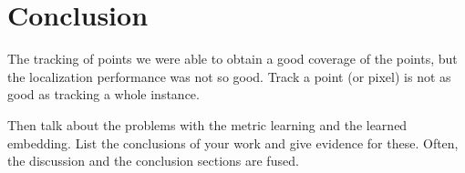 
%

\chapter{Conclusion}

The tracking of points we were able to obtain a good coverage of the points, but the localization performance was not so good. Track a point (or pixel) is not as good as tracking a whole instance.

Then talk about the problems with the metric learning and the learned embedding.
List the conclusions of your work and give evidence for these. Often, the discussion and the conclusion sections are fused. 

